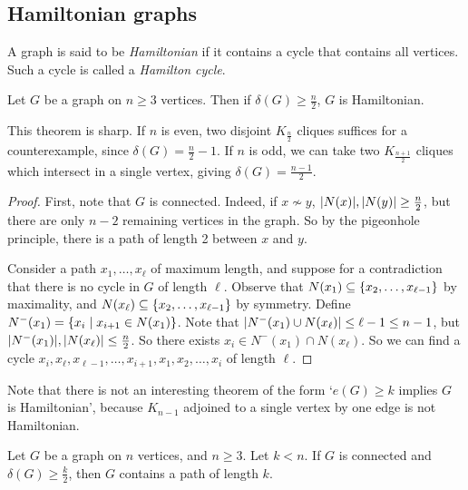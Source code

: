 \subsection{Hamiltonian graphs}
\begin{definition}
	A graph is said to be \emph{Hamiltonian} if it contains a cycle that contains all vertices.
	Such a cycle is called a \emph{Hamilton cycle}.
\end{definition}
\begin{theorem}
	Let \( G \) be a graph on \( n \geq 3 \) vertices.
	Then if \( \delta(G) \geq \frac{n}{2} \), \( G \) is Hamiltonian.
\end{theorem}
\begin{remark}
	This theorem is sharp.
	If \( n \) is even, two disjoint \( K_{\frac{n}{2}} \) cliques suffices for a counterexample, since \( \delta(G) = \frac{n}{2} - 1 \).
	If \( n \) is odd, we can take two \( K_{\frac{n+1}{2}} \) cliques which intersect in a single vertex, giving \( \delta(G) = \frac{n-1}{2} \).
\end{remark}
\begin{proof}
	First, note that \( G \) is connected.
	Indeed, if \( x \not\sim y \), \( \abs{N(x)}, \abs{N(y)} \geq \frac{n}{2} \), but there are only \( n - 2 \) remaining vertices in the graph.
	So by the pigeonhole principle, there is a path of length 2 between \( x \) and \( y \).

	Consider a path \( x_1, \dots, x_\ell \) of maximum length, and suppose for a contradiction that there is no cycle in \( G \) of length \( \ell \).
	Observe that \( N(x_1) \subseteq \qty{x_2, \dots, x_{\ell - 1}} \) by maximality, and \( N(x_\ell) \subseteq \qty{x_2, \dots, x_{\ell - 1}} \) by symmetry.
	Define \( N^-(x_1) = \qty{x_i \mid x_{i+1} \in N(x_1)} \).
	Note that \( \abs{N^-(x_1) \cup N(x_\ell)} \leq \ell - 1 \leq n - 1 \), but \( \abs{N^-(x_1)}, \abs{N(x_\ell)} \leq \frac{n}{2} \).
	So there exists \( x_i \in N^-(x_1) \cap N(x_\ell) \).
	So we can find a cycle \( x_i, x_\ell, x_{\ell-1}, \dots, x_{i+1}, x_1, x_2, \dots, x_i \) of length \( \ell \).
\end{proof}
\begin{remark}
	Note that there is not an interesting theorem of the form `\( e(G) \geq k \) implies \( G \) is Hamiltonian', because \( K_{n-1} \) adjoined to a single vertex by one edge is not Hamiltonian.
\end{remark}
\begin{lemma}
	Let \( G \) be a graph on \( n \) vertices, and \( n \geq 3 \).
	Let \( k < n \).
	If \( G \) is connected and \( \delta(G) \geq \frac{k}{2} \), then \( G \) contains a path of length \( k \).
\end{lemma}
